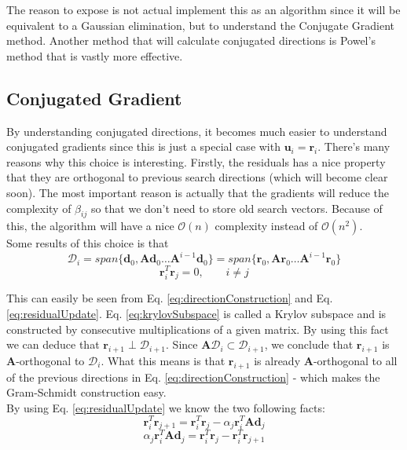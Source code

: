 \documentclass[a4paper,10pt]{article}
\theoremstyle{definition}
\begin{document}
The reason to expose is not actual implement this as an algorithm since it will be equivalent to a Gaussian elimination, but to understand the Conjugate Gradient method. Another method that will calculate conjugated directions is Powel's method that is vastly more effective.

\subsection{Conjugated Gradient}

By understanding conjugated directions, it becomes much easier to understand conjugated gradients since this is just a special case with $\pmb{u}_i = \pmb{r}_i$. There's many reasons why this choice is interesting. Firstly, the residuals has a nice property that they are orthogonal to previous search directions (which will become clear soon). The most important reason is actually that the gradients will reduce the complexity of $\beta_{ij}$ so that we don't need to store old search vectors. Because of this, the algorithm will have a nice $\mathcal{O}(n)$ complexity instead of $\mathcal{O}(n^2)$.\\

Some results of this choice is that
\begin{equation}
	\mathcal{D}_i = span\{\pmb{d}_0, \pmb{A} \pmb{d}_0 \dots \pmb{A}^{i-1}\pmb{d}_0\} = span\{\pmb{r}_0, \pmb{A} \pmb{r}_0 \dots \pmb{A}^{i-1}\pmb{r}_0\}
	\label{eq:krylovSubspace}
\end{equation}
\begin{equation}
	\pmb{r}_i^T\pmb{r}_j = 0, \qquad i \neq j
\end{equation}

This can easily be seen from Eq. \ref{eq:directionConstruction} and Eq. \ref{eq:residualUpdate}. Eq. \ref{eq:krylovSubspace} is called a Krylov subspace and is constructed by consecutive multiplications of a given matrix. By using this fact we can deduce that $\pmb{r}_{i+1} \perp \mathcal{D}_{i+1} $. Since $\pmb{A}\mathcal{D}_i \subset \mathcal{D}_{i+1}$, we conclude that $\pmb{r}_{i+1}$ is $\pmb{A}$-orthogonal to $\mathcal{D}_i$. What this means is that $\pmb{r}_{i+1}$ is already $\pmb{A}$-orthogonal to all of the previous directions in Eq. \ref{eq:directionConstruction} - which makes the Gram-Schmidt construction easy. \\

By using Eq. \ref{eq:residualUpdate} we know the two following facts:
\begin{equation}
	\pmb{r}_i^T \pmb{r}_{j+1} = \pmb{r}_{i}^T\pmb{r}_{j} - \alpha_j\pmb{r}_{i}^T\pmb{A}\pmb{d}_{j}
\end{equation}
\begin{equation}
	\alpha_j\pmb{r}_{i}^T\pmb{A}\pmb{d}_{j} = \pmb{r}_{i}^T\pmb{r}_{j} - \pmb{r}_i^T \pmb{r}_{j+1}
\end{equation}
\end{document}
